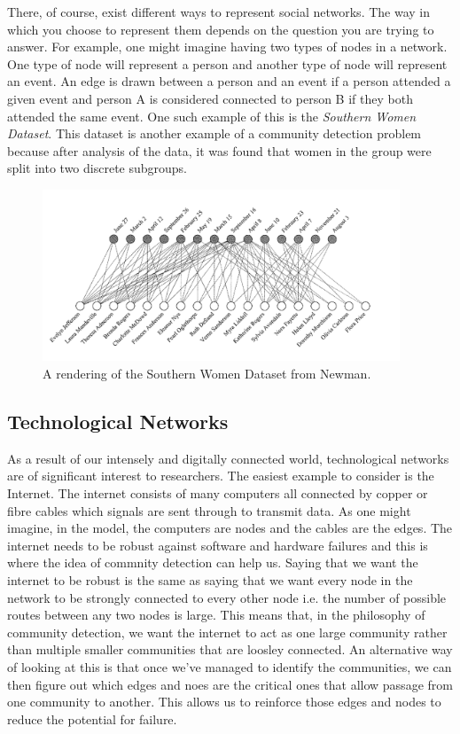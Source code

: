 There, of course, exist different ways to represent social networks. The way in which you choose to represent them depends on the question you are trying to answer. For example, one might imagine having two types of nodes in a network. One type of node will represent a person and another type of node will represent an event. An edge is drawn between a person and an event if a person attended a given event and person A is considered connected to person B if they both attended the same event. One such example of this is the \emph{Southern Women Dataset}.\cite{konect:southernwomen} This dataset is another example of a community detection problem because after analysis of the data, it was found that women in the group were split into two discrete subgroups.

\begin{figure}
    \begin{center}
        \includegraphics[width=0.95\textwidth]{img/southern_women}
    \end{center}
    \caption{A rendering of the Southern Women Dataset from Newman.\cite[39]{newman10}}
    \label{fig:southernwomen}
\end{figure}

\subsection{Technological Networks}\label{sec:Technological Networks}
As a result of our intensely and digitally connected world, technological networks are of significant interest to researchers. The easiest example to consider is the Internet. The internet consists of many computers all connected by copper or fibre cables which signals are sent through to transmit data. As one might imagine, in the model, the computers are nodes and the cables are the edges. The internet needs to be robust against software and hardware failures and this is where the idea of commnity detection can help us. Saying that we want the internet to be robust is the same as saying that we want every node in the network to be strongly connected to every other node i.e. the number of possible routes between any two nodes is large. This means that, in the philosophy of community detection, we want the internet to act as one large community rather than multiple smaller communities that are loosley connected. An alternative way of looking at this is that once we've managed to identify the communities, we can then figure out which edges and noes are the critical ones that allow passage from one community to another. This allows us to reinforce those edges and nodes to reduce the potential for failure.

